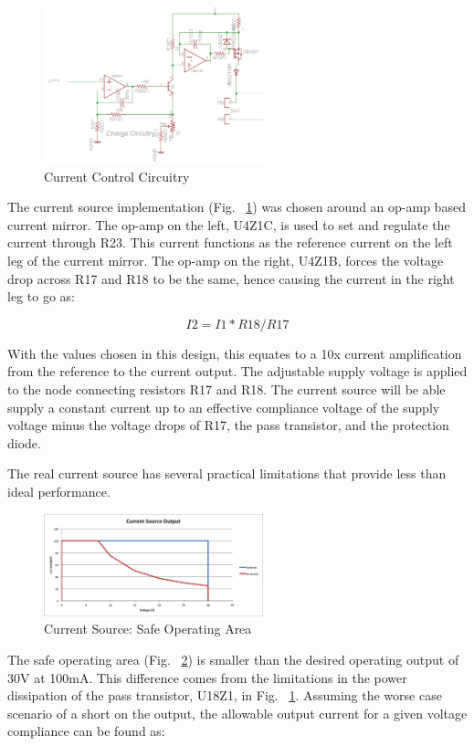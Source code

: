 \documentclass[journal]{IEEEtran}
\begin{document}
\begin{figure}[here]
\centering
\includegraphics[width=2.5in]{currentMirror}
\caption{Current Control Circuitry}
\label{fig:currentMirror}
\end{figure}


The current source implementation (Fig. ~\ref{fig:currentMirror}) was chosen around an op-amp based current mirror. The op-amp on the left, U4Z1C, is used to set and regulate the current through R23. This current functions as the reference current on the left leg of the current mirror. The op-amp on the right, U4Z1B, forces the voltage drop across R17 and R18 to be the same, hence causing the current in the right leg to go as:

\begin{equation}
I2 = I1*R18/R17
\end{equation}

With the values chosen in this design, this equates to a 10x current amplification from the reference to the current output. The adjustable supply voltage is applied to the node connecting resistors R17 and R18. The current source will be able supply a constant current up to an effective compliance voltage of the supply voltage minus the voltage drops of R17, the pass transistor, and the protection diode.

The real current source has several practical limitations that provide less than ideal performance. 

 
\begin{figure}[here]
\centering
\includegraphics[width=2.5in]{safeOpArea}
\caption{Current Source: Safe Operating Area}
\label{fig:safeOpArea}
\end{figure}

The safe operating area (Fig.  ~\ref{fig:safeOpArea}) is smaller than the desired operating output of 30V at 100mA. This difference comes from the limitations in the power dissipation of the pass transistor, U18Z1, in Fig. ~\ref{fig:currentMirror}. Assuming the worse case scenario of a short on the output, the allowable output current for a given voltage compliance can be found as:
\end{document}
